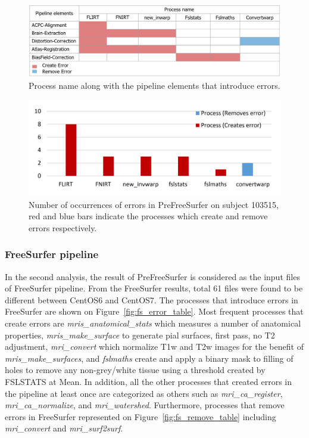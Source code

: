 \documentclass{article}
\begin{document}
{\begin{figure}[H]
\centering
  \includegraphics[scale=0.5]{images/pfs_table.png}
  \caption{Process name along with the pipeline elements that introduce 
  errors.}
  \label{fig:pfs_table}
\end{figure}

\begin{figure}[H]
\centering
  \includegraphics[scale=0.38]{images/pfs_chart.png} \caption{Number 
  of occurrences of errors in PreFreeSurfer on subject 103515, red and 
  blue bars indicate the processes which create and remove errors 
  respectively.} 
  \label{fig:pfs_chart}
\end{figure}


\subsubsection{FreeSurfer pipeline} 

In the second analysis, the result of 
PreFreeSurfer is considered as the input files of FreeSurfer pipeline. 
From the FreeSurfer results, total 61 files were found to be different 
between CentOS6 and CentOS7. The processes that introduce errors in 
FreeSurfer are shown on Figure~\ref{fig:fs_error_table}. Most frequent 
processes that create errors are \emph{mris\_anatomical\_stats} which 
measures a number of anatomical properties, \emph{mris\_make\_surface} 
to generate pial surfaces, first pass, no T2 adjustment, 
\emph{mri\_convert} which normalize T1w and T2w images for the benefit 
of \emph{mris\_make\_surfaces}, and \emph{fslmaths} create and apply a 
binary mask to filling of holes to remove  any non-grey/white tissue 
using a threshold created by FSLSTATS at Mean. In addition, all the 
other processes that created errors in the pipeline at least once are 
categorized as others such as \emph{mri\_ca\_register}, 
\emph{mri\_ca\_normalize}, and \emph{mri\_watershed}. Furthermore, 
processes that remove errors in FreeSurfer represented on 
Figure~\ref{fig:fs_remove_table} including \emph{mri\_convert} and 
\emph{mri\_surf2surf}. 

}
\end{document}
